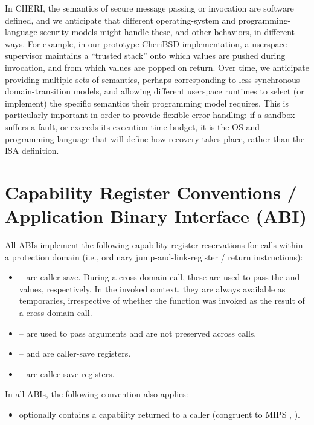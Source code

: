In CHERI, the semantics of secure message passing or invocation are software defined, and we anticipate that different operating-system and programming-language security models might handle these, and other behaviors, in different ways.
For example, in our prototype CheriBSD implementation, a userspace supervisor maintains a ``trusted stack'' onto which values are pushed during invocation, and from which values are popped on return.
Over time, we anticipate providing multiple sets of semantics, perhaps corresponding to less synchronous domain-transition models, and allowing different userspace runtimes to select (or implement) the specific semantics their programming model requires.
This is particularly important in order to provide flexible error handling: if a sandbox suffers a fault, or exceeds its execution-time budget, it is the OS and programming language that will define how recovery takes place, rather than the ISA definition.

\section{Capability Register Conventions / Application Binary Interface
  (ABI)}

All ABIs implement the following capability register reservations for calls
within a protection domain (i.e., ordinary jump-and-link-register / return
instructions):

\begin{itemize}
	\item {}-- are caller-save.  During a cross-domain call, these are used to pass the \PCC{} and \IDC{} values, respectively.  In the invoked context, they are always available as temporaries, irrespective of whether the function was invoked as the result of a cross-domain call.
	\item {}-- are used to pass arguments and are not preserved across calls.
	\item {}-- and  are caller-save registers.
	\item {}-- are callee-save registers.
\end{itemize}

\noindent
In all ABIs, the following convention also applies:

\begin{itemize}
\item {} optionally contains a capability returned to a caller
  (congruent to MIPS , ).
\end{itemize}

